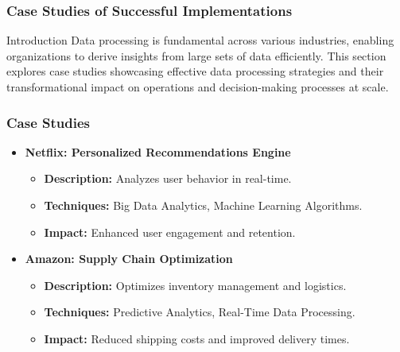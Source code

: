 \documentclass[aspectratio=169]{beamer}
\begin{document}
\begin{frame}[fragile]
    \frametitle{Case Studies of Successful Implementations}
    \begin{block}{Introduction}
        Data processing is fundamental across various industries, enabling organizations to derive insights from large sets of data efficiently. This section explores case studies showcasing effective data processing strategies and their transformational impact on operations and decision-making processes at scale.
    \end{block}
\end{frame}

\begin{frame}[fragile]
    \frametitle{Case Studies}
    \begin{itemize}
        \item \textbf{Netflix: Personalized Recommendations Engine}
            \begin{itemize}
                \item \textbf{Description:} Analyzes user behavior in real-time.
                \item \textbf{Techniques:} Big Data Analytics, Machine Learning Algorithms.
                \item \textbf{Impact:} Enhanced user engagement and retention.
            \end{itemize}
        
        \item \textbf{Amazon: Supply Chain Optimization}
            \begin{itemize}
                \item \textbf{Description:} Optimizes inventory management and logistics.
                \item \textbf{Techniques:} Predictive Analytics, Real-Time Data Processing.
                \item \textbf{Impact:} Reduced shipping costs and improved delivery times.
            \end{itemize}
    \end{itemize}
\end{frame}
\end{document}
